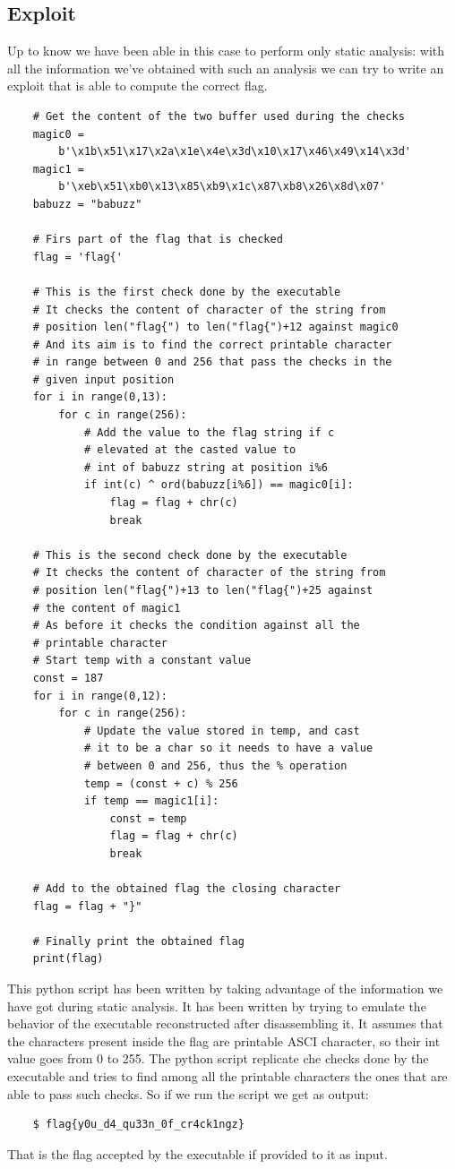 \documentclass{article}
\begin{document}
\subsection{Exploit}
Up to know we have been able in this case to perform only static analysis: with all the information we've obtained with such an analysis we can try to write an exploit that is able to compute the correct flag.
\begin{verbatim}
    # Get the content of the two buffer used during the checks
    magic0 = 
        b'\x1b\x51\x17\x2a\x1e\x4e\x3d\x10\x17\x46\x49\x14\x3d'
    magic1 = 
        b'\xeb\x51\xb0\x13\x85\xb9\x1c\x87\xb8\x26\x8d\x07'
    babuzz = "babuzz"

    # Firs part of the flag that is checked
    flag = 'flag{'

    # This is the first check done by the executable
    # It checks the content of character of the string from
    # position len("flag{") to len("flag{")+12 against magic0
    # And its aim is to find the correct printable character
    # in range between 0 and 256 that pass the checks in the 
    # given input position
    for i in range(0,13):
        for c in range(256):
            # Add the value to the flag string if c
            # elevated at the casted value to
            # int of babuzz string at position i%6
            if int(c) ^ ord(babuzz[i%6]) == magic0[i]:
                flag = flag + chr(c)
                break

    # This is the second check done by the executable
    # It checks the content of character of the string from
    # position len("flag{")+13 to len("flag{")+25 against
    # the content of magic1
    # As before it checks the condition against all the
    # printable character
    # Start temp with a constant value
    const = 187
    for i in range(0,12):
        for c in range(256):
            # Update the value stored in temp, and cast
            # it to be a char so it needs to have a value
            # between 0 and 256, thus the % operation
            temp = (const + c) % 256
            if temp == magic1[i]:
                const = temp
                flag = flag + chr(c)
                break

    # Add to the obtained flag the closing character
    flag = flag + "}"

    # Finally print the obtained flag
    print(flag)
\end{verbatim}
This python script has been written by taking advantage of the information we have got during static analysis. It has been written by trying to emulate the behavior of the executable reconstructed after disassembling it.
It assumes that the characters present inside the flag are printable ASCI character, so their int value goes from 0 to 255. The python script replicate che checks done by the executable and tries to find among all the printable characters 
the ones that are able to pass such checks.
So if we run the script we get as output:
\begin{verbatim}
    $ flag{y0u_d4_qu33n_0f_cr4ck1ngz}
\end{verbatim}
That is the flag accepted by the executable if provided to it as input.
\end{document}
